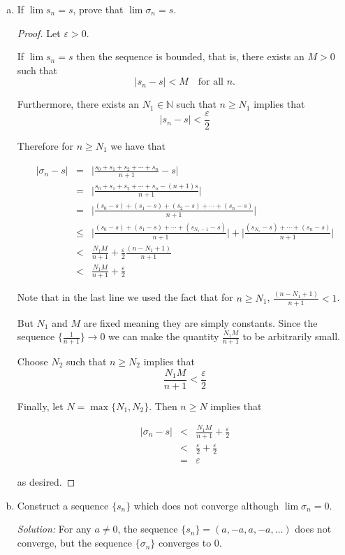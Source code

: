  \begin{enumerate}[(a)]
 	\item  If $\lim s_{n} = s$, prove that $\lim \sigma_{n} = s$.
	
	\begin{proof}
			Let $\varepsilon >0$.
			
			If $\lim s_{n} = s$  then the sequence is bounded, that is, there exists an $M >0$ such that $$ |s_n - s| < M \quad \text{for all } n. $$
			
			Furthermore, there exists an $N_{1} \in \mathbb{N}$ such that $n \geq N_{1}$ implies that $$  |s_n - s|< \frac{\varepsilon}{2} $$
			
			Therefore for $n \geq N_{1}$ we have that 
			
			\begin{eqnarray*}
|\sigma_n - s|  &=& \big|\frac{s_0 + s_1 + s_2 + \cdots + s_n}{n+1}  - s\big|  \\
   	&=& \big|\frac{s_0 + s_1 + s_2 + \cdots + s_n - (n+1)s}{n+1}\big| \\
   &=& \big|\frac{(s_0-s) + (s_1 -s) + (s_2 -s)  + \cdots + (s_n - s)}{n+1}\big| \\
   &\leq & \big|\frac{(s_0-s) + (s_1 -s) +\cdots + (s_{N_{1} - 1} -s) }{n+1}\big|  + \big|\frac{(s_{N_{1}} -s) + \cdots + (s_n - s)}{n+1}\big| \\
   &<& \frac{N_{1} M}{n+1}  + \frac{\varepsilon}{2}\frac{(n - N_{1} + 1)}{n+1}\\
   &<& \frac{N_{1} M}{n+1}  + \frac{\varepsilon}{2}
\end{eqnarray*}

Note that in the last line we used the fact that for $n \geq N_1$, $\frac{(n - N_{1} + 1)}{n+1} < 1$. 


But $N_{1}$ and $M$ are fixed meaning they are simply constants.  Since the sequence $\{\frac{1}{n+1}\} \rightarrow 0$ we can make the quantity $\frac{N_{1} M}{n+1}$ to be arbitrarily small.

Choose $N_2$ such that $n \geq N_2$ implies that $$ \frac{N_{1} M}{n+1} < \frac{\varepsilon}{2} $$




Finally, let $N = \max\{N_1, N_2\}$.   Then $n \geq N$ implies that 


\begin{eqnarray*}
|\sigma_n - s|  &<& \frac{N_{1} M}{n+1}  + \frac{\varepsilon}{2}\\
		&<& \frac{\varepsilon}{2} + \frac{\varepsilon}{2} \\
		&=&  \varepsilon
\end{eqnarray*}

as desired.	
	\end{proof}
	\item  Construct a sequence $\{s_{n}\}$ which does not converge although $\lim \sigma_{n} = 0$.
	
	\noindent
	\emph{Solution:}   For any $a \neq 0$, the sequence $\{s_{n}\} = (a, -a, a, -a, \ldots )$ does not converge, but the sequence $\{\sigma_{n}\}$ converges to $0$.
 \end{enumerate}

